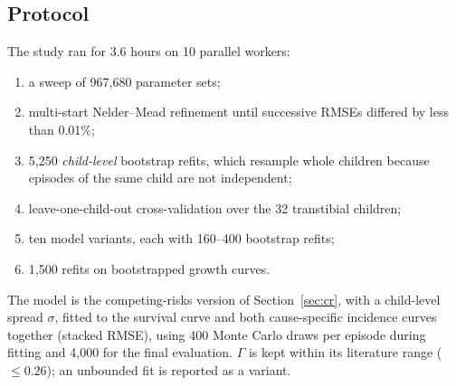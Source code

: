 \documentclass[11pt]{article}
\theoremstyle{definition}
\begin{document}
\subsection{Protocol}
The study ran for 3.6 hours on 10 parallel workers:
\begin{enumerate}[leftmargin=2em,itemsep=1pt]
\item a sweep of 967,680 parameter sets;
\item multi-start Nelder--Mead refinement until successive RMSEs differed by less than 0.01\%;
\item 5,250 \emph{child-level} bootstrap refits, which resample whole children because episodes of the same child are not independent;
\item leave-one-child-out cross-validation over the 32 transtibial children;
\item ten model variants, each with 160--400 bootstrap refits;
\item 1,500 refits on bootstrapped growth curves.
\end{enumerate}
The model is the competing-risks version of Section~\ref{sec:cr}, with a child-level spread $\sigma$, fitted to the survival curve and both cause-specific incidence curves together (stacked RMSE), using 400 Monte Carlo draws per episode during fitting and 4,000 for the final evaluation. $\Gamma$ is kept within its literature range ($\le0.26$); an unbounded fit is reported as a variant.
\end{document}
